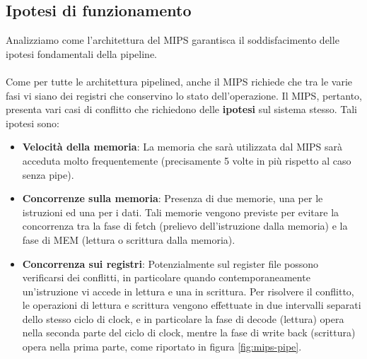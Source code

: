 \subsection{Ipotesi di funzionamento}
Analizziamo come l'architettura del MIPS garantisca il soddisfacimento delle ipotesi fondamentali della pipeline.
\\
\\
Come per tutte le architettura pipelined, anche il MIPS richiede che tra le varie fasi vi siano dei registri che conservino lo stato dell'operazione.
Il MIPS, pertanto, presenta vari casi di conflitto che richiedono delle \textbf{ipotesi} sul sistema stesso. Tali ipotesi sono:
\begin{itemize}
    \item \textbf{Velocità della memoria}: La memoria che sarà utilizzata dal MIPS sarà acceduta molto frequentemente (precisamente 5 volte in più rispetto al caso senza pipe).
    \item \textbf{Concorrenze sulla memoria}: Presenza di due memorie, una per le istruzioni ed una per i dati. Tali memorie vengono previste per evitare la concorrenza tra la fase di fetch (prelievo dell'istruzione dalla memoria) e la fase di MEM (lettura o scrittura dalla memoria). 
    \item \textbf{Concorrenza sui registri}: Potenzialmente sul register file possono verificarsi dei conflitti, in particolare quando contemporaneamente un'istruzione vi accede in lettura e una in scrittura. Per risolvere il conflitto, le operazioni di lettura e scrittura vengono effettuate in due intervalli separati dello stesso ciclo di clock, e in particolare la fase di decode (lettura) opera nella seconda parte del ciclo di clock, mentre la fase di write back (scrittura) opera nella prima parte, come riportato in figura \ref{fig:mips-pipe}.
\end{itemize}


